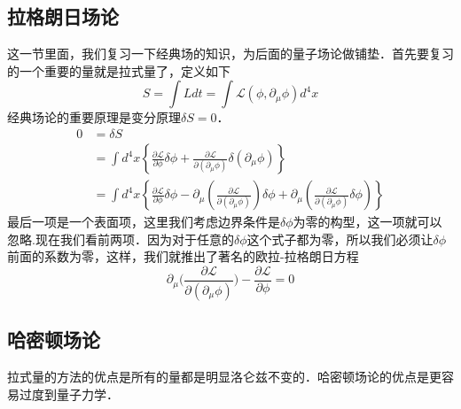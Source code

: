 

\subsection{拉格朗日场论}
这一节里面，我们复习一下经典场的知识，为后面的量子场论做铺垫．首先要复习的一个重要的量就是拉式量了，定义如下
\begin{equation}
S = \int L dt = \int \mathcal L(\phi,\partial_\mu \phi)d^4 x
\end{equation}
经典场论的重要原理是变分原理$\delta S = 0$．
\begin{equation}
\begin{aligned}
0 &=\delta S \\
&=\int d^{4} x\left\{\frac{\partial \mathcal{L}}{\partial \phi} \delta \phi+\frac{\partial \mathcal{L}}{\partial\left(\partial_{\mu} \phi\right)} \delta\left(\partial_{\mu} \phi\right)\right\} \\
&=\int d^{4} x\left\{\frac{\partial \mathcal{L}}{\partial \phi} \delta \phi-\partial_{\mu}\left(\frac{\partial \mathcal{L}}{\partial\left(\partial_{\mu} \phi\right)}\right) \delta \phi+\partial_{\mu}\left(\frac{\partial \mathcal{L}}{\partial\left(\partial_{\mu} \phi\right)} \delta \phi\right)\right\}
\end{aligned}
\end{equation} 
最后一项是一个表面项，这里我们考虑边界条件是$\delta \phi$为零的构型，这一项就可以忽略.现在我们看前两项．因为对于任意的$\delta \phi$这个式子都为零，所以我们必须让$\delta \phi$前面的系数为零，这样，我们就推出了著名的欧拉-拉格朗日方程
\begin{equation}
\partial_\mu \bigg( \frac{\partial \mathcal L}{\partial(\partial_\mu\phi)} \bigg) - \frac{\partial \mathcal L}{\partial \phi} = 0 
\end{equation}

\subsection{哈密顿场论}
拉式量的方法的优点是所有的量都是明显洛仑兹不变的．哈密顿场论的优点是更容易过度到量子力学．

